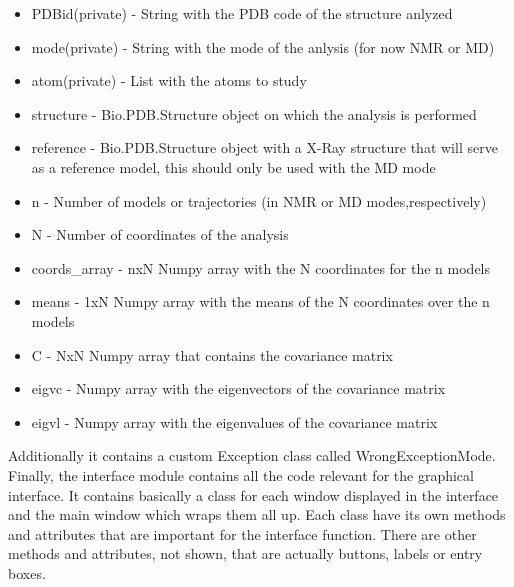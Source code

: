 \documentclass[12pt]{article}
\begin{document}
\begin{itemize}
        \item PDBid(private) - String with the PDB code of the structure anlyzed
        \item mode(private) - String with the mode of the anlysis (for now NMR or MD)
        \item atom(private) - List with the atoms to study
        \item structure - Bio.PDB.Structure object on which the analysis is performed
        \item reference - Bio.PDB.Structure object with a X-Ray structure
                that will serve as a reference model, this should only be used
                with the MD mode
        \item n - Number of models or trajectories (in NMR or MD modes,respectively)
        \item N - Number of coordinates of the analysis
       \item coords\_array - nxN Numpy array with the N coordinates for the n models
       \item means - 1xN Numpy array with the means of the N coordinates over the n
            models
	\item  C - NxN Numpy array that contains the covariance matrix
       \item eigvc - Numpy array with the eigenvectors of the covariance matrix
       \item eigvl - Numpy array with the eigenvalues of the covariance matrix
\end{itemize}

Additionally it contains a custom Exception class called WrongExceptionMode.\\

Finally, the interface module contains all the code relevant for the graphical interface. It contains basically a class for each window displayed in the interface and the main window which wraps them all up. Each class have its own methods and attributes that are important for the interface function. There are other methods and attributes, not shown, that are actually buttons, labels or entry boxes.  \\
\end{document}
